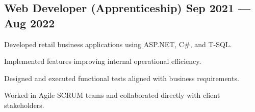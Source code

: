 \subsection{{Web Developer (Apprenticeship) \hfill Sep 2021 --- Aug 2022}}
\begin{zitemize}
    \item Developed retail business applications using ASP.NET, C\#, and T-SQL.
    \item Implemented features improving internal operational efficiency.
    \item Designed and executed functional tests aligned with business requirements.
    \item Worked in Agile SCRUM teams and collaborated directly with client stakeholders.
\end{zitemize}
